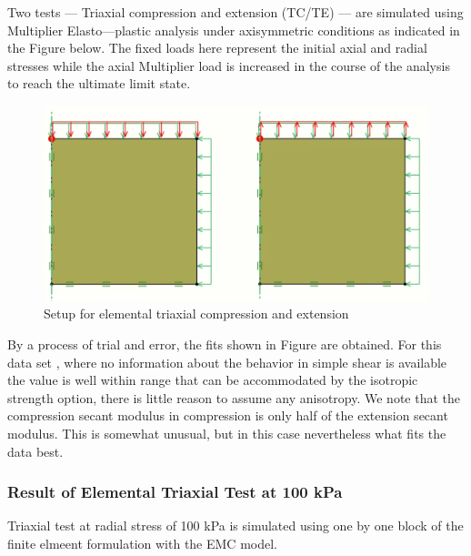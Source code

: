 \documentclass[a4paper, nobind]{templates/ociamthesis}
\begin{document}
Two tests --- Triaxial compression and extension (TC/TE) --- are simulated using Multiplier Elasto---plastic analysis under axisymmetric conditions as indicated in the Figure below.
The fixed loads here represent the initial axial and radial stresses while the axial Multiplier load is increased in the course of the analysis to reach the ultimate limit state.

\begin{figure}[H]
\includegraphics[width=1\linewidth]{myfigureeeeee/setup for TC and TE} \caption{Setup for elemental triaxial compression and extension}\label{fig:unnamed-chunk-10}
\end{figure}

By a process of trial and error, the fits shown in Figure are obtained. For this data set , where no information about the behavior in simple shear is available the value is well within range that can be accommodated by the isotropic strength option, there is little reason to assume any anisotropy.
We note that the compression secant modulus in compression is only half of the extension secant modulus. This is somewhat unusual, but in this case nevertheless what fits the data best.

\hypertarget{result-of-elemental-triaxial-test-at-100-kpa}{%
\subsubsection{Result of Elemental Triaxial Test at 100 kPa}\label{result-of-elemental-triaxial-test-at-100-kpa}}

Triaxial test at radial stress of 100 kPa is simulated using one by one block of the finite elmeent formulation with the EMC model.
\end{document}
